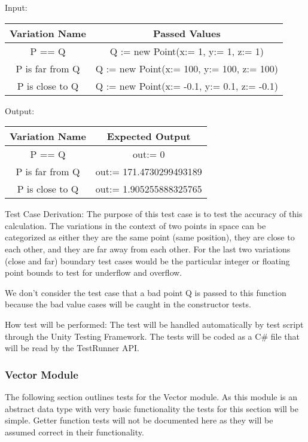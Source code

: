 \documentclass[12pt, titlepage]{article}
\begin{document}
\begin{enumerate}
Input: 
\begin{tabular}{|c|c|}
	\hline
	\textbf{Variation Name} & \textbf{Passed Values}\\
	\hline
	P == Q & Q := new Point(x:= 1, y:= 1, z:= 1) \\
	P is far from Q & Q := new Point(x:= 100, y:= 100, z:= 100) \\
	P is close to Q & Q := new Point(x:= -0.1, y:= 0.1, z:= -0.1) \\	
	\hline
\end{tabular}
					
Output:
\begin{tabular}{|c|c|}
	\hline
	\textbf{Variation Name} & \textbf{Expected Output}\\
	\hline
	P == Q & out:= 0 \\
	P is far from Q & out:= 171.4730299493189 \\
	P is close to Q & out:= 1.905255888325765 \\		
	\hline
\end{tabular}

Test Case Derivation: The purpose of this test case is to test the accuracy of 
this calculation. The variations in the context of two points in space can be 
categorized as either they are the same point (same position), they are close 
to each other, and they are far away from each other. For the last two 
variations (close and far) boundary test cases would be the particular integer 
or floating point bounds to test for underflow and overflow.

We don't consider the test case that a bad point Q is 
passed to this function because the bad value cases will be caught in the 
constructor tests.

How test will be performed: The test will be handled automatically by test 
script through the Unity Testing Framework. The tests will be coded as a C$\#$
file that will be read by the TestRunner API.  
\end{enumerate}

\subsubsection{Vector Module}
The following section outlines tests for the Vector module. As this module is 
an abstract data type with very basic functionality the tests for this section 
will be simple. Getter function tests will not be documented here as they will 
be assumed correct in their functionality.
\end{document}
